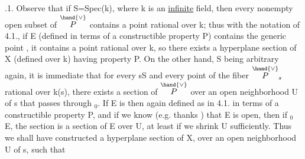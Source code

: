 .1. Observe that if S=Spec(k), where k is an \uline{infinite} field, then every nonempty open subset
of $\overset{\hand{\vee}}{P}$ contains a point rational over k; thus with the notation of
4.1., if E (defined in terms of a constructible property P) contains
the generic point \hand{$\eta$}, it contains  a point rational over k, so
there exists a hyperplane section of X (defined over k) having property P.
On the other hand, S being arbitrary again, it is immediate that for every
s\hand{$\in$}S and every point of the fiber $\overset{\hand{\vee}}{P}_s$ rational over k(s), there exists a section
\hand{$\xi$} of $\overset{\hand{\vee}}{P}$ over an open neighborhood U of s that passes through \hand{$\xi$}$_0$. If E is then
again  defined as in 4.1. in terms of a constructible property
P, and if we know (e.g. thanks ) that E is open, then
if \hand{$\xi$}$_0$\hand{$\in$} E,  the section \hand{$\xi$} is a section of E over 
U, at least if we shrink U sufficiently. Thus we shall have constructed a
hyperplane section of X, over an open neighborhood U of s, such that

